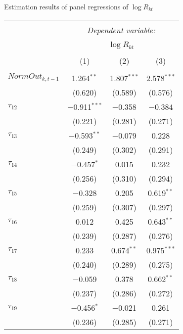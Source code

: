   \caption{Estimation results of panel regressions of $\log R_{kt}$} 
  \label{} 
\small
\begin{tabular}{@{\extracolsep{5pt}}lccc} 
\\[-1.8ex]\hline 
\hline \\[-1.8ex] 
 & \multicolumn{3}{c}{\textit{Dependent variable:}} \\ 
\cline{2-4} 
\\[-1.8ex] & \multicolumn{3}{c}{$\log R_{kt}$} \\ 
\\[-1.8ex] & (1) & (2) & (3)\\ 
\hline \\[-1.8ex] 
 $NormOut_{k,t-1}$ & 1.264$^{**}$ & 1.807$^{***}$ & 2.578$^{***}$ \\ 
  & (0.620) & (0.589) & (0.576) \\ 
   
 $\tau_{12}$ & $-$0.911$^{***}$ & $-$0.358 & $-$0.384 \\ 
  & (0.221) & (0.281) & (0.271) \\ 
   
 $\tau_{13}$ & $-$0.593$^{**}$ & $-$0.079 & 0.228 \\ 
  & (0.249) & (0.302) & (0.291) \\ 
   
 $\tau_{14}$ & $-$0.457$^{*}$ & 0.015 & 0.232 \\ 
  & (0.256) & (0.310) & (0.294) \\ 
   
 $\tau_{15}$ & $-$0.328 & 0.205 & 0.619$^{**}$ \\ 
  & (0.259) & (0.307) & (0.297) \\ 
   
 $\tau_{16}$ & 0.012 & 0.425 & 0.643$^{**}$ \\ 
  & (0.239) & (0.287) & (0.276) \\ 
   
 $\tau_{17}$ & 0.233 & 0.674$^{**}$ & 0.975$^{***}$ \\ 
  & (0.240) & (0.289) & (0.275) \\ 
   
 $\tau_{18}$ & $-$0.059 & 0.378 & 0.662$^{**}$ \\ 
  & (0.237) & (0.286) & (0.272) \\ 
   
 $\tau_{19}$ & $-$0.456$^{*}$ & $-$0.021 & 0.261 \\ 
  & (0.236) & (0.285) & (0.271) \\ 
   

\end{tabular}
